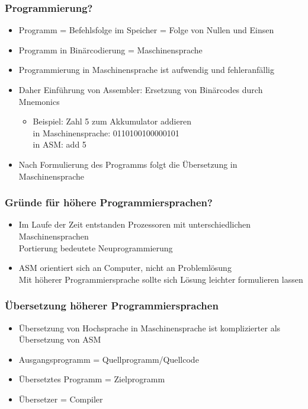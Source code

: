 \begin{frame}
\frametitle{Programmierung?}
\begin{itemize}
  \item Programm = Befehlsfolge im Speicher = Folge von Nullen und Einsen
  \item Programm in Binärcodierung = Maschinensprache
  \item Programmierung in Maschinensprache ist aufwendig und fehleranfällig
  \item Daher Einführung von Assembler: Ersetzung von Binärcodes durch Mnemonics
  		\begin{itemize}
  			\item Beispiel: Zahl 5 zum Akkumulator addieren\\
  							in Maschinensprache: 0110100100000101 \\
  							in ASM: add 5
  		\end{itemize}
  \item Nach Formulierung des Programms folgt die Übersetzung in
  Maschinensprache
\end{itemize}
\end{frame}

\begin{frame}
\frametitle{Gründe für höhere Programmiersprachen?}
\begin{itemize}
  \item Im Laufe der Zeit entstanden Prozessoren mit unterschiedlichen
  Maschinensprachen\\
  Portierung bedeutete Neuprogrammierung
  \item ASM orientiert sich an Computer, nicht an Problemlösung\\
  Mit höherer Programmiersprache sollte sich Lösung leichter formulieren lassen
\end{itemize}
\end{frame}

\begin{frame}
\frametitle{Übersetzung höherer Programmiersprachen}
\begin{itemize}
  \item Übersetzung von Hochsprache in Maschinensprache ist komplizierter als
  Übersetzung von ASM
  \item Ausgangsprogramm = Quellprogramm/Quellcode
  \item Übersetztes Programm = Zielprogramm
  \item Übersetzer = Compiler
\end{itemize}
\end{frame}
